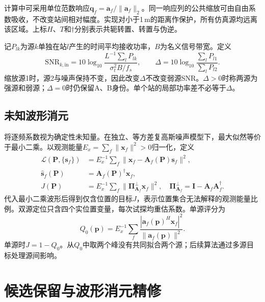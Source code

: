 \documentclass[a4paper,fleqn]{cas-sc}
\begin{document}
计算中可采用单位范数响应$\bm q_f=\bm a_f/\|\bm a_f\|_2$。同一响应列的公共缩放可由自由系数吸收，不改变站间相对幅度。实现对小于1\,m的距离作保护，所有仿真源均远离该区域。上标$H$、$T$和$\dagger$分别表示共轭转置、转置与伪逆。

记$P_{lk}$为源$k$单独在站$l$产生的时间平均接收功率，$B$为名义信号带宽。定义
\begin{equation}
\mathrm{SNR}_{k,\mathrm{in}}=10\log_{10}
 \frac{L^{-1}\sum_lP_{lk}}{\sigma_t^2 B/f_s},\qquad
\Delta=10\log_{10}\frac{\sum_lP_{l1}}{\sum_lP_{l2}}.
\label{en:snr}
\end{equation}
缩放源1时，源2与噪声保持不变，因此改变$\Delta$不改变弱源SNR。$\Delta>0$时称两源为强源和弱源；$\Delta=0$时仍保留A、B身份。单个站的局部功率差不必等于$\Delta$。

\FloatBarrier
\subsection{未知波形消元}
将逐频系数视为确定性未知量。在独立、等方差复高斯噪声模型下，最大似然等价于最小二乘。以观测能量$E_x=\sum_f\|\bm x_f\|^2>0$归一化，定义
\begin{align}
\mathcal L(\bm P,\{\bm s_f\})&=E_x^{-1}\sum_f
 \|\bm x_f-\bm A_f(\bm P)\bm s_f\|^2,\\
\widehat{\bm s}_f(\bm P)&=\bm A_f(\bm P)^\dagger\bm x_f,\label{en:waveLS}\\
J(\bm P)&=E_x^{-1}\sum_f\|\bm\Pi_{\bm A_f}^{\perp}\bm x_f\|^2,
\quad \bm\Pi_{\bm A_f}^{\perp}=\bm I-\bm A_f\bm A_f^\dagger.
\label{en:profile}
\end{align}
代入最小二乘波形后得到仅含位置的目标$J$\cite{GolubPereyra1973}，表示位置集合无法解释的观测能量比例。双源定位只含四个实位置变量，每次试探均重估系数。单源评分为
\begin{equation}
Q_0(\bm p)=E_x^{-1}\sum_f
 \frac{|\bm a_f(\bm p)^H\bm x_f|^2}{\|\bm a_f(\bm p)\|^2}.
\label{en:single}
\end{equation}
单源时$J=1-Q_0$。从$Q_0$中取两个峰没有共同拟合两个源；后续算法通过多源目标处理源间影响。

\FloatBarrier
\section{候选保留与波形消元精修}
\FloatBarrier
\end{document}
